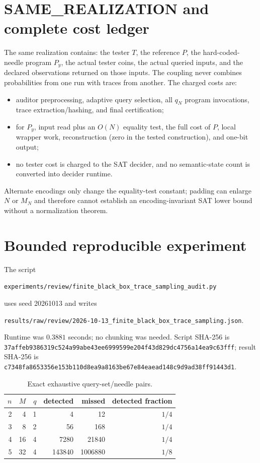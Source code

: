 \documentclass[11pt]{article}
\begin{document}
\section{SAME\_REALIZATION and complete cost ledger}

The same realization contains: the tester $T$, the reference $P$, the hard-coded-needle program $P_y$, the actual tester coins, the actual queried inputs, and the declared observations returned on those inputs.  The coupling never combines probabilities from one run with traces from another.  The charged costs are:
\begin{itemize}[leftmargin=*]
\item auditor preprocessing, adaptive query selection, all $q_N$ program invocations, trace extraction/hashing, and final certification;
\item for $P_y$, input read plus an $O(N)$ equality test, the full cost of $P$, local wrapper work, reconstruction (zero in the tested construction), and one-bit output;
\item no tester cost is charged to the SAT decider, and no semantic-state count is converted into decider runtime.
\end{itemize}
Alternate encodings only change the equality-test constant; padding can enlarge $N$ or $M_N$ and therefore cannot establish an encoding-invariant SAT lower bound without a normalization theorem.

\section{Bounded reproducible experiment}

The script
\begin{center}
\texttt{experiments/review/finite\_black\_box\_trace\_sampling\_audit.py}
\end{center}
uses seed 20261013 and writes
\begin{center}
\texttt{results/raw/review/2026-10-13\_finite\_black\_box\_trace\_sampling.json}.
\end{center}
Runtime was $0.3881$ seconds; no chunking was needed.  Script SHA-256 is
\texttt{37affeb9386319c524a99abe43ee6999599e204f43d829dc4756a14ea9c63fff}; result SHA-256 is
\texttt{c7348fa8653356e153b110d8ea9a8163be67e84eaead148c9d9ad38ff91443d1}.

\begin{table}[ht]
\centering
\caption{Exact exhaustive query-set/needle pairs.}
\begin{tabular}{rrrrrr}
\toprule
$n$ & $M$ & $q$ & detected & missed & detected fraction\\
\midrule
2&4&1&4&12&$1/4$\\
3&8&2&56&168&$1/4$\\
4&16&4&7280&21840&$1/4$\\
5&32&4&143840&1006880&$1/8$\\
\bottomrule
\end{tabular}
\end{table}
\end{document}
